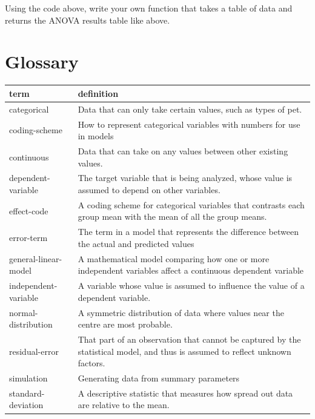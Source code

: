 \documentclass[
  oneside]{book}
\begin{document}
\begin{try}
Using the code above, write your own function that takes a table of data and returns the ANOVA results table like above.

\end{try}

\hypertarget{glossary-glm}{%
\section{Glossary}\label{glossary-glm}}

\begin{tabular}{l|l}
\hline
term & definition\\
\hline
categorical & Data that can only take certain values, such as types of pet.\\
\hline
coding-scheme & How to represent categorical variables with numbers for use in models\\
\hline
continuous & Data that can take on any values between other existing values.\\
\hline
dependent-variable & The target variable that is being analyzed, whose value is assumed to depend on other variables.\\
\hline
effect-code & A coding scheme for categorical variables that contrasts each group mean with the mean of all the group means.\\
\hline
error-term & The term in a model that represents the difference between the actual and predicted values\\
\hline
general-linear-model & A mathematical model comparing how one or more independent variables affect a continuous dependent variable\\
\hline
independent-variable & A variable whose value is assumed to influence the value of a dependent variable.\\
\hline
normal-distribution & A symmetric distribution of data where values near the centre are most probable.\\
\hline
residual-error & That part of an observation that cannot be captured by the statistical model, and thus is assumed to reflect unknown factors.\\
\hline
simulation & Generating data from summary parameters\\
\hline
standard-deviation & A descriptive statistic that measures how spread out data are relative to the mean.\\
\hline
\end{tabular}
\end{document}
